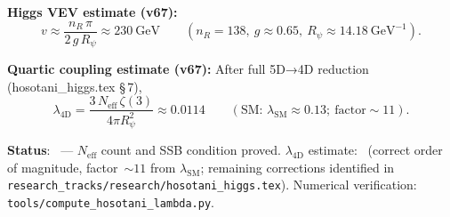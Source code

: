 \medskip
\noindent\textbf{Higgs VEV estimate (v67):}
\begin{equation}
  v \approx \frac{n_R\,\pi}{2\,g\,R_\psi} \approx 230~\text{GeV}
  \qquad (n_R = 138,\ g \approx 0.65,\ R_\psi \approx 14.18~\text{GeV}^{-1}).
\end{equation}

\noindent\textbf{Quartic coupling estimate (v67):}
After full 5D→4D reduction (hosotani\_higgs.tex §\,7),
\begin{equation}
  \lambda_{\text{4D}}
  = \frac{3\,N_{\mathrm{eff}}\,\zeta(3)}{4\pi R_\psi^2}
  \approx 0.0114
  \qquad (\text{SM: } \lambda_{\text{SM}} \approx 0.13;\ \text{factor} \sim 11).
\end{equation}

\noindent\textbf{Status}: \Lone\ — $N_{\mathrm{eff}}$ count and SSB condition proved.
$\lambda_{\mathrm{4D}}$ estimate: \Lone\ (correct order of magnitude, factor~$\sim 11$
from $\lambda_{\mathrm{SM}}$; remaining corrections identified in
\texttt{research\_tracks/research/hosotani\_higgs.tex}).
Numerical verification: \texttt{tools/compute\_hosotani\_lambda.py}.
